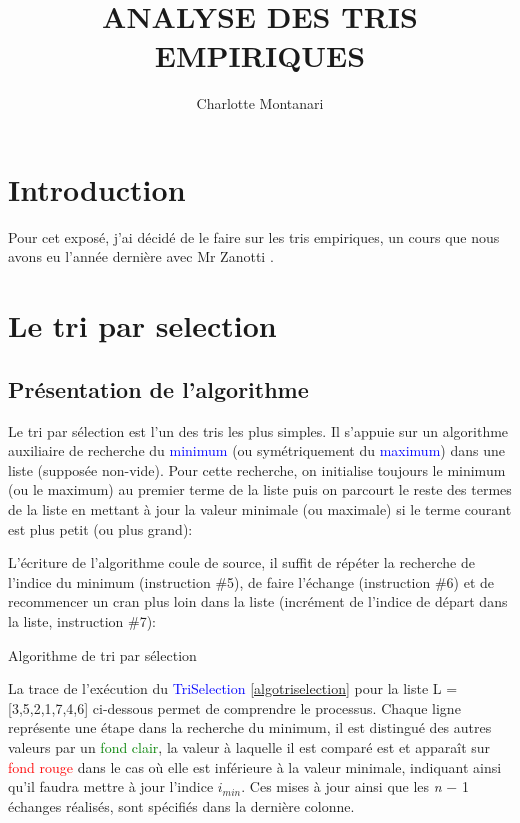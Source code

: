 \documentclass[a4paper,10pt]{article}
\title{\Huge\bfseries\MakeUppercase{Analyse des tris empiriques}}
\author{Charlotte Montanari}
\begin{document}
\maketitle 
\tableofcontents


\section{Introduction}
Pour cet exposé, j'ai décidé de le faire sur les tris empiriques, un cours que nous avons eu l'année dernière avec 
Mr Zanotti \cite{zanotti}.

\section{Le tri par selection}
\subsection{Présentation de l'algorithme}
Le tri par sélection est l'un des tris les plus simples. 
Il s'appuie sur un algorithme auxiliaire de re­cher­che du \textcolor{blue}{minimum} (ou symétriquement 
du \textcolor{blue}{maximum}) dans une liste (supposée non-vide). 
Pour cette recherche, on initialise toujours le minimum (ou le maximum) 
au premier terme de la liste puis on parcourt le reste des termes de la liste en mettant à jour 
la valeur minimale (ou maximale) si le terme courant est plus petit (ou plus grand):


L'écriture de l'algorithme coule de source, il suffit de répéter la recherche de 
l'indice du minimum (instruction \#5), de faire l'échange (instruction \#6) et de 
recommencer un cran plus loin dans la liste (incrément de l'indice de départ dans la liste, instruction \#7):
\begin{center}
    
    Algorithme de tri par sélection\label{algotriselection}
\end{center}

La trace de l'exécution du \textcolor{blue}{TriSelection} \ref{algotriselection} pour la liste L = [3,5,2,1,7,4,6]
ci-dessous permet de comprendre le processus. Chaque ligne représente une étape dans la recherche du minimum, 
il est distingué des autres valeurs par un \textcolor{green}{fond clair}, la valeur à laquelle il est comparé 
est  et apparaît sur \textcolor{red}{fond rouge} dans le cas où elle est inférieure à la valeur minimale, 
indiquant ainsi qu'il faudra mettre à jour l'indice $i_{min}$. Ces mises à jour ainsi que les {\itshape n} $-$ 1 
échanges réalisés, sont spé­ci­fiés dans la dernière colonne.
\end{document}
